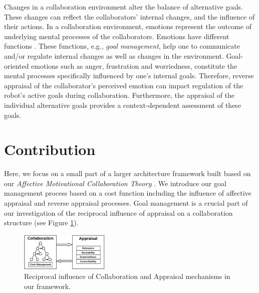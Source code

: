 \documentclass[conference]{IEEEtran}
\begin{document}

Changes in a collaboration environment alter the balance of alternative goals.
These changes can reflect the collaborators' internal changes, and the influence
of their actions. In a collaboration environment, emotions represent the outcome
of underlying mental processes of the collaborators. Emotions have different
functions \cite{scheutz:architectural-action-selection}. These functions, e.g.,
\textit{goal management}, help one to communicate and/or regulate internal
changes as well as changes in the environment. Goal-oriented emotions such as
anger, frustration and worriedness, constitute the mental processes specifically
influenced by one's internal goals. Therefore, reverse appraisal
\cite{gratch:reverse-appraisal} of the collaborator's perceived emotion can
impact regulation of the robot's active goals during collaboration.
Furthermore, the appraisal of the individual alternative goals provides a
context-dependent assessment of these goals. 



\vspace*{-3mm}
\section{Contribution}
\vspace*{-2mm}
Here, we focus on a small part of a larger architecture framework built based on
our \textit{Affective Motivational Collaboration Theory}
\cite{shayganfar:amct-symbiotic}. We introduce our goal management process based
on a cost function including the influence of affective appraisal and reverse
appraisal processes. Goal management is a crucial part of our investigation of
the reciprocal influence of appraisal on a collaboration structure (see Figure
\ref{fig:actionSelection}).

\begin{figure}[tbh]
  \centering
  \includegraphics[width=0.38\textwidth]{figure/ActionSelection-croped.pdf}
  \vspace*{-2mm}
  \caption{{\fontsize{9}{9}\selectfont Reciprocal influence of Collaboration
  and Appraisal mechanisms in our framework.}}
  \label{fig:actionSelection}
  \vspace*{-6mm}
\end{figure}
\end{document}
